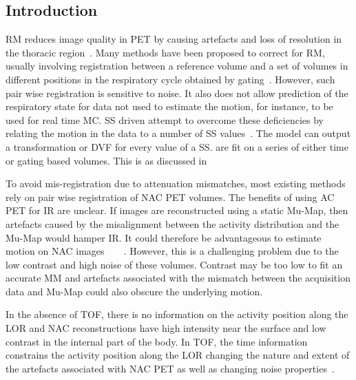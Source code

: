         \subsection{Introduction} \label{sec:impact_of_tof_on_respiratory_motion_model_estimation_using_pre_gated_no_intra_cycle_motion_nac_pet_introduction}
        \gls{RM} reduces image quality in \gls{PET} by causing artefacts and loss of resolution in the thoracic region~. Many methods have been proposed to correct for \gls{RM}, usually involving registration between a reference volume and a set of volumes in different positions in the respiratory cycle obtained by gating~. However, such pair wise registration is sensitive to noise. It also does not allow prediction of the respiratory state for data not used to estimate the motion, for instance, to be used for real time \gls{MC}. \gls{SS} driven  attempt to overcome these deficiencies by relating the motion in the data to a number of \gls{SS} values~. The model can output a transformation or \gls{DVF} for every value of a \gls{SS}.  are fit on a series of either time or gating based volumes. This is as discussed in~

        To avoid mis-registration due to attenuation mismatches, most existing methods rely on pair wise registration of \gls{NAC} \gls{PET} volumes. The benefits of using \gls{AC} \gls{PET} for \gls{IR} are unclear. If images are reconstructed using a static \gls{Mu-Map}, then artefacts caused by the misalignment between the activity distribution and the \gls{Mu-Map} would hamper \gls{IR}. It could therefore be advantageous to estimate motion on \gls{NAC} images~~~~. However, this is a challenging problem due to the low contrast and high noise of these volumes. Contrast may be too low to fit an accurate \gls{MM} and artefacts associated with the mismatch between the acquisition data and \gls{Mu-Map} could also obscure the underlying motion.
        
        In the absence of \gls{TOF}, there is no information on the activity position along the \gls{LOR} and \gls{NAC} reconstructions have high intensity near the surface and low contrast in the internal part of the body. In \gls{TOF}, the time information constrains the activity position along the \gls{LOR} changing the nature and extent of the artefacts associated with \gls{NAC} \gls{PET} as well as changing noise properties~.
        
